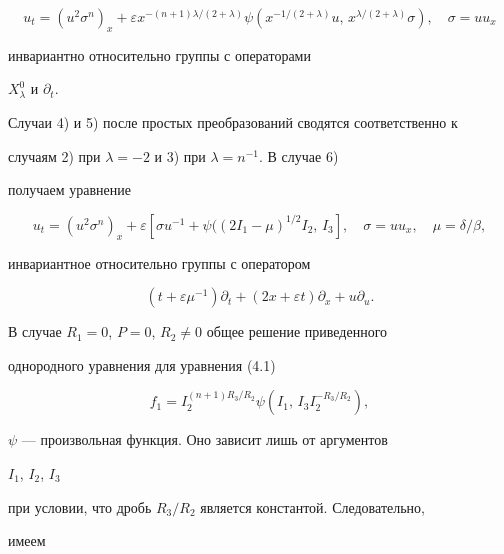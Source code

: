\begin{equation}


u_t=(u^2\sigma^n)_x+\varepsilon x^{-(n+1)\lambda/(2+\lambda)}


\psi(x^{-1/(2+\lambda)}u,\,x^{\lambda/(2+\lambda)}\sigma),\quad


\sigma=uu_x \tag{4.16}


\end{equation}


инвариантно относительно группы с операторами


$X^0_\lambda$ и $\partial_t$.





Случаи 4) и 5) после простых преобразований сводятся соответственно к


случаям 2) при $\lambda=-2$ и 3) при $\lambda=n^{-1}$. В случае 6)


получаем уравнение


\begin{equation}


u_t=(u^2\sigma^n)_x+\varepsilon[\sigma u^{-1}+\psi((2I_1-\mu)^{1/2}


I_2,\,I_3],\quad \sigma=uu_x,\quad \mu=\delta/\beta,\tag{4.17}


\end{equation}


инвариантное относительно группы с оператором


\begin{equation}


(t+\varepsilon\mu^{-1})\partial_t+(2x+\varepsilon t)\partial_x


+u\partial_u.\tag{4.18}


\end{equation}





В случае $R_1=0$, $P=0$, $R_2\ne 0$ общее решение приведенного


однородного уравнения для уравнения (4.1)


$$


f_1=I_2^{(n+1)R_3/R_2}\psi(I_1,\,I_3I_2^{-R_3/R_2}),


$$


$\psi$ --- произвольная функция. Оно зависит лишь от аргументов


$I_1$, $I_2$, $I_3$


при условии, что дробь $R_3/R_2$ является константой. Следовательно,


имеем


